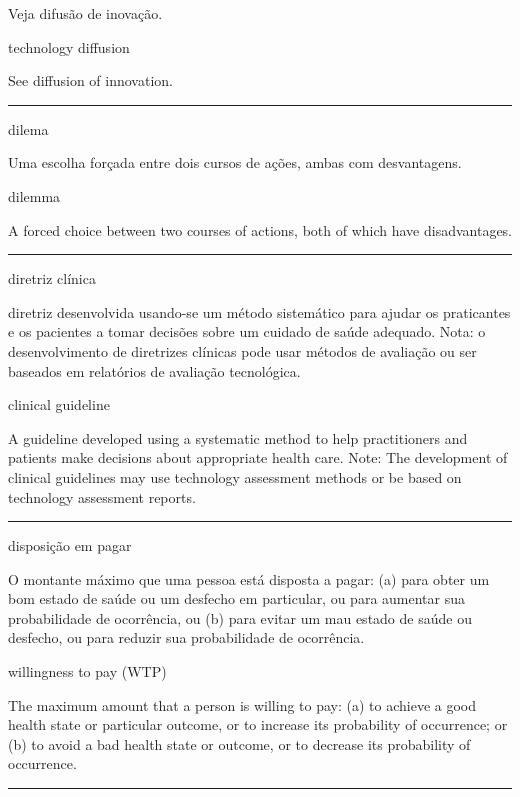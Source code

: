 \documentclass[
]{book}
\begin{document}
Veja difusão de inovação.

technology diffusion

See diffusion of innovation.

\begin{center}\rule{0.5\linewidth}{0.5pt}\end{center}

dilema

Uma escolha forçada entre dois cursos de ações, ambas com desvantagens.

dilemma

A forced choice between two courses of actions, both of which have disadvantages.

\begin{center}\rule{0.5\linewidth}{0.5pt}\end{center}

diretriz clínica

diretriz desenvolvida usando-se um método sistemático para ajudar os praticantes e os pacientes a tomar decisões sobre um cuidado de saúde adequado. Nota: o desenvolvimento de diretrizes clínicas pode usar métodos de avaliação ou ser baseados em relatórios de avaliação tecnológica.

clinical guideline

A guideline developed using a systematic method to help practitioners and patients make decisions about appropriate health care. Note: The development of clinical guidelines may use technology assessment methods or be based on technology assessment reports.

\begin{center}\rule{0.5\linewidth}{0.5pt}\end{center}

disposição em pagar

O montante máximo que uma pessoa está disposta a pagar: (a) para obter um bom estado de saúde ou um desfecho em particular, ou para aumentar sua probabilidade de ocorrência, ou (b) para evitar um mau estado de saúde ou desfecho, ou para reduzir sua probabilidade de ocorrência.

willingness to pay (WTP)

The maximum amount that a person is willing to pay: (a) to achieve a good health state or particular outcome, or to increase its probability of occurrence; or (b) to avoid a bad health state or outcome, or to decrease its probability of occurrence.

\begin{center}\rule{0.5\linewidth}{0.5pt}\end{center}
\end{document}
